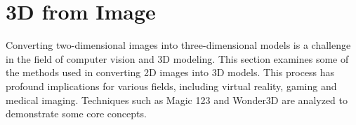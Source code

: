 \section{3D from Image}\label{3d from image}

Converting two-dimensional images into three-dimensional models is a challenge in the field of computer vision and 3D modeling. This section examines some of the methods used in converting 2D images into 3D models. This process has profound implications for various fields, including virtual reality, gaming and medical imaging. Techniques such as Magic 123 and Wonder3D are analyzed to demonstrate some core concepts.


